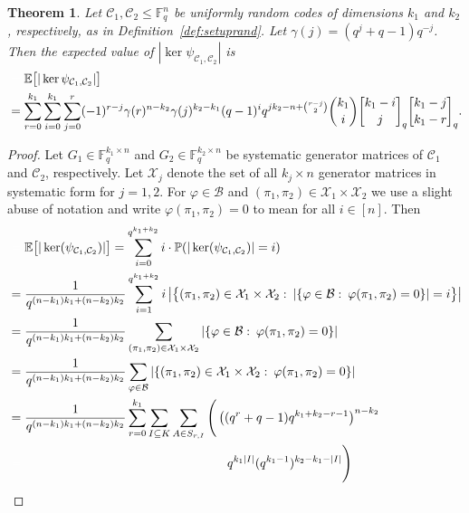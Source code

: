 \documentclass[a4paper,11pt,reqno]{article}
\newcommand{\F}{\mathbb{F}}
\newcommand{\C}{\mathcal{C}}
\newcommand{\mcX}{\mathcal X}
\newcommand{\mcB}{\mathcal B}
\newcommand{\qbinom}[2]{\genfrac[]{0pt}{0}{#1}{#2}}
\theoremstyle{plain} \numberwithin{equation}{section}
\newtheorem{theorem}{Theorem}[section]
\theoremstyle{definition}
\begin{document}
\begin{theorem} \label{theorem:expectedkernel}    Let $\C_1, \C_2 \leq \F_q^n$ be uniformly random codes of dimensions $k_1$ and $k_2$, respectively, as in Definition~\ref{def:setuprand}. Let $\gamma(j) = (q^j+q-1)q^{-j}$. Then the expected value of $|\ker \psi_{\C_1,\C_2}|$ is
\begin{align*} 
&\mathcolor{white}{=}\mathbb{E}\big[|\ker \psi_{\C_1,\C_2}|\big]\\ 
&= 
\sum_{r=0}^{k_1}\sum_{i=0}^{k_1}\sum_{j=0}^{r}(-1)^{r-j}\gamma(r)^{n-k_2}\gamma(j)^{k_2-k_1} (q-1)^i q^{jk_2-n+ \binom{r-j}{2}}\binom{k_1}{i}\qbinom{k_1-i}{j}_q \qbinom{k_1-j}{k_1-r}_q.
\end{align*}
\end{theorem}
\begin{proof}
    Let $G_1 \in \F_q^{k_1 \times n}$ and $G_2 \in \F_q^{k_2 \times n}$ be systematic generator matrices of $\C_1$ and $\C_2$, respectively. Let $\mathcal{X}_j$ denote the set of all $k_j\times n$ generator matrices in systematic form for $j=1,2$. For $\varphi\in \mcB$ and $(\pi_1,\pi_2)\in \mcX_1\times \mcX_2$ we use a slight abuse of notation and write $\varphi(\pi_1,\pi_2) =0$ to mean  for all $i\in [n]$. Then 
\begin{align}
    &\mathcolor{white}{=} \mathbb{E}\big[|\ker(\psi_{\C_1,\C_2})|\big] 
     = \sum^{q^{k_1+k_2}}_{i=0} i \cdot \mathbb{P}(|\ker( \psi_{\C_1,\C_2})| = i) \notag \\
     &=\frac{1}{q^{(n-k_1)k_1+(n-k_2)k_2}}\sum_{i=1}^{q^{k_1+k_2}}i \left|\big\{(\pi_1, \pi_2) \in  \mcX_1 \times \mcX_2 \, \colon \,  | \{\varphi \in \mcB\, \colon \, \varphi(\pi_1, \pi_2) = 0\}|=i \big\} \right| \notag \\
     &= \frac{1}{q^{(n-k_1)k_1+(n-k_2)k_2}} \sum_{(\pi_1,\pi_2) \in \mcX_1 \times \mcX_2} | \{\varphi \in \mcB \, \colon \, \varphi(\pi_1, \pi_2) = 0\}| \notag \\
     &=  \frac{1}{q^{(n-k_1)k_1+(n-k_2)k_2}}\sum_{\varphi \in \mcB} |\{ (\pi_1, \pi_2) \in \mcX_1 \times \mcX_2 \, \colon \, \varphi(\pi_1, \pi_2) = 0\}| \notag \\
    &
=\frac{1}{q^{(n-k_1)k_1+(n-k_2)k_2}}
\sum_{r=0}^{k_1}\sum_{I \subseteq K}\sum_{A \in S_{r,I}}
\Bigg(
\left((q^r + q - 1)q^{k_1+k_2-r-1}\right)^{n-k_2} \notag \\
&\mathcolor{white}{=} \hspace{5.7cm}
q^{k_1|I|}(q^{k_1-1})^{k_2-k_1-|I|}
\Bigg)
\label{eq:proof1} \\

\end{align}
\end{proof}
\end{document}
